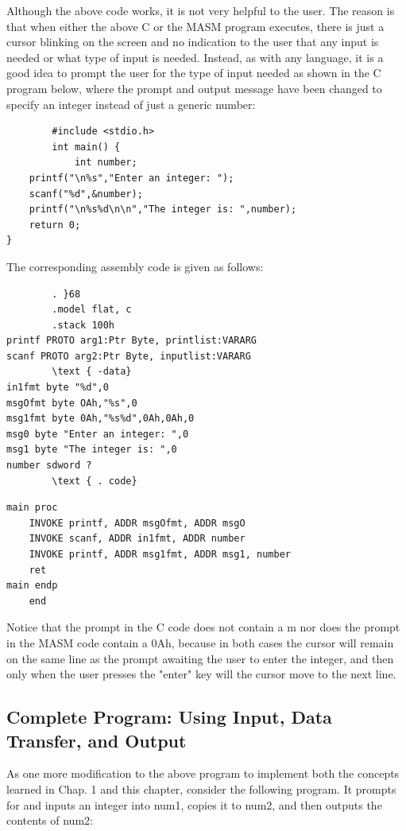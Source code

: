 \documentclass[10pt]{article}
\begin{document}
Although the above code works, it is not very helpful to the user. The reason is that when either the above C or the MASM program executes, there is just a cursor blinking on the screen and no indication to the user that any input is needed or what type of input is needed. Instead, as with any language, it is a good idea to prompt the user for the type of input needed as shown in the C program below, where the prompt and output message have been changed to specify an integer instead of just a generic number:

\begin{verbatim}
        #include <stdio.h>
        int main() {
            int number;
    printf("\n%s","Enter an integer: ");
    scanf("%d",&number);
    printf("\n%s%d\n\n","The integer is: ",number);
    return 0;
}
\end{verbatim}

The corresponding assembly code is given as follows:

\begin{verbatim}
        . }68
        .model flat, c
        .stack 100h
printf PROTO arg1:Ptr Byte, printlist:VARARG
scanf PROTO arg2:Ptr Byte, inputlist:VARARG
        \text { -data}
in1fmt byte "%d",0
msgOfmt byte OAh,"%s",0
msg1fmt byte 0Ah,"%s%d",0Ah,0Ah,0
msg0 byte "Enter an integer: ",0
msg1 byte "The integer is: ",0
number sdword ?
        \text { . code}
\end{verbatim}

\begin{verbatim}
main proc
    INVOKE printf, ADDR msgOfmt, ADDR msgO
    INVOKE scanf, ADDR in1fmt, ADDR number
    INVOKE printf, ADDR msg1fmt, ADDR msg1, number
    ret
main endp
    end
\end{verbatim}

Notice that the prompt in the C code does not contain a m nor does the prompt in the MASM code contain a 0Ah, because in both cases the cursor will remain on the same line as the prompt awaiting the user to enter the integer, and then only when the user presses the "enter" key will the cursor move to the next line.

\subsection*{Complete Program: Using Input, Data Transfer, and Output}
As one more modification to the above program to implement both the concepts learned in Chap. 1 and this chapter, consider the following program. It prompts for and inputs an integer into num1, copies it to num2, and then outputs the contents of num2:
\end{document}
